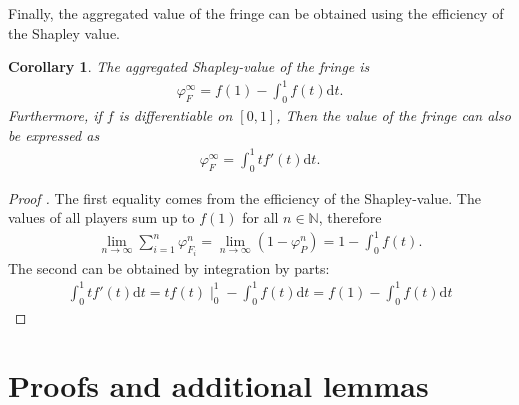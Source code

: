 \documentclass[a4paper]{article}
\newtheorem{corollary}{Corollary}
\newcommand{\dt}{\mathrm{d}t}
\begin{document}
Finally, the aggregated value of the fringe can be obtained using the efficiency of the Shapley value.

\begin{corollary}
    \label{cor:fringe_value}
    The aggregated Shapley-value of the fringe is
    \begin{align*}
        \varphi_F^\infty = f(1) - \int_0^1 f(t) \dt.
    \end{align*}
    Furthermore, if $f$ is differentiable on $[0, 1]$, Then the value of the fringe can also be expressed as
    \begin{align*}
        \varphi_F^\infty = \int_0^1 t f'(t) \dt.
    \end{align*}
\end{corollary}

\begin{proof}[Proof%
    ]
    The first equality comes from the efficiency of the Shapley-value. The values of all players sum up to $f(1)$ for all $n \in \mathbb{N}$, therefore
    \begin{align*}
        \lim_{n \to \infty} \sum_{i=1}^n \varphi_{F_i}^n = \lim_{n \to \infty} (1 - \varphi_P^n ) = 1 - \int_0^1 f(t).
    \end{align*}
    The second can be obtained by integration by parts:
    \begin{align*}
        \int_0^1 t f'(t) \dt = tf(t) \mid_0^1 - \int_0^1 f(t) \dt = f(1) - \int_0^1 f(t) \dt
    \end{align*}
\end{proof}


\section{Proofs and additional lemmas}
\end{document}
